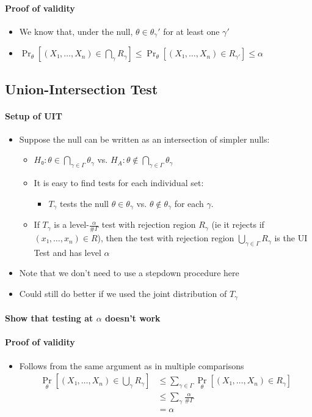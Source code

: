 \paragraph{Proof of validity}
\begin{itemize}
\item We know that, under the null, $θ ∈ θ_γ'$ for at least one $γ'$
\item $\Pr_θ[(X₁,…,X_n) ∈ ⋂_γ R_γ] ≤ \Pr_θ[(X₁,…, X_n) ∈ R_{γ'}] ≤ α$
\end{itemize}

\subsection{Union-Intersection Test}

\paragraph{Setup of UIT}
\begin{itemize}
\item Suppose the null can be written as an intersection of simpler
  nulls:
  \begin{itemize}
  \item $H₀: θ ∈ ⋂_{γ ∈ Γ} θ_γ$ vs.  $H_A: θ ∉ ⋂_{γ ∈ Γ} θ_γ$
  \item It is easy to find tests for each individual set:
    \begin{itemize}
    \item $T_γ$ tests the null $θ ∈ θ_γ$ vs. $θ ∉ θ_γ$ for each $γ$.
    \end{itemize}
  \item If $T_γ$ is a level-$\frac{α}{\# Γ}$ test with rejection
    region $R_γ$ (ie it rejects if $(x₁,…,x_n) ∈ R$), then the test
    with rejection region $⋃_{γ ∈ Γ} R_γ$ is the UI Test and has level
    $α$
  \end{itemize}
\item Note that we don't need to use a stepdown procedure here
\item Could still do better if we used the joint distribution of $T_γ$
\end{itemize}

\paragraph{Show that testing at $α$ doesn't work}

\paragraph{Proof of validity}
\begin{itemize}
\item Follows from the same argument as in multiple comparisons
  \begin{align*}
    \Pr_θ[(X₁,…,X_n) ∈ ⋃_{γ} R_γ] 
    &≤ ∑_{γ ∈ Γ} \Pr_θ[(X₁,…,X_n) ∈ R_γ] \\
    &≤ ∑_γ \frac{α}{\#Γ} \\
    &= α
  \end{align*}
\end{itemize}

